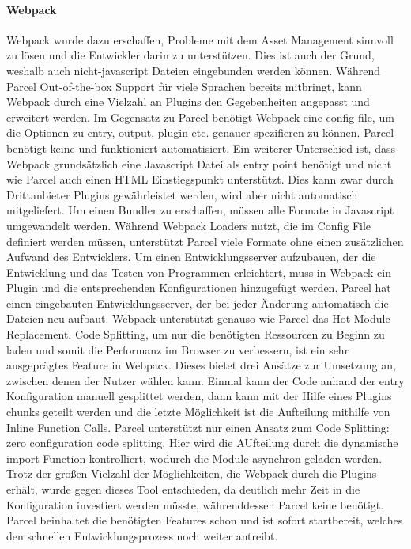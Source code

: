 \paragraph{Webpack} Webpack wurde dazu erschaffen, Probleme mit dem Asset Management sinnvoll zu lösen und die Entwickler darin zu unterstützen. Dies ist auch der Grund, weshalb auch nicht-javascript Dateien eingebunden werden können. Während Parcel Out-of-the-box Support für viele Sprachen bereits mitbringt, kann Webpack durch eine Vielzahl an Plugins den Gegebenheiten angepasst und erweitert werden. Im Gegensatz zu Parcel benötigt Webpack eine config file, um die Optionen zu entry, output, plugin etc. genauer spezifieren zu können. Parcel benötigt keine und funktioniert automatisiert. Ein weiterer Unterschied ist, dass Webpack grundsätzlich eine Javascript Datei als entry point benötigt und nicht wie Parcel auch einen HTML Einstiegspunkt unterstützt. Dies kann zwar durch Drittanbieter Plugins gewährleistet werden, wird aber nicht automatisch mitgeliefert. Um einen Bundler zu erschaffen, müssen alle Formate in Javascript umgewandelt werden. Während Webpack Loaders nutzt, die im Config File definiert werden müssen, unterstützt Parcel viele Formate ohne einen zusätzlichen Aufwand des Entwicklers. Um einen Entwicklungsserver aufzubauen, der die Entwicklung und das Testen von Programmen erleichtert, muss in Webpack ein Plugin und die entsprechenden Konfigurationen hinzugefügt werden. Parcel hat einen eingebauten Entwicklungsserver, der bei jeder Änderung automatisch die Dateien neu aufbaut. Webpack unterstützt genauso wie Parcel das Hot Module Replacement. Code Splitting, um nur die benötigten Ressourcen zu Beginn zu laden und somit die Performanz im Browser zu verbessern, ist ein sehr ausgeprägtes Feature in Webpack. Dieses bietet drei Ansätze zur Umsetzung an, zwischen denen der Nutzer wählen kann. Einmal kann der Code anhand der entry Konfiguration manuell gesplittet werden, dann kann mit der Hilfe eines Plugins chunks geteilt werden und die letzte Möglichkeit ist die Aufteilung mithilfe von Inline Function Calls. Parcel unterstützt nur einen Ansatz zum Code Splitting: zero configuration code splitting. Hier wird die AUfteilung durch die dynamische import Function kontrolliert, wodurch die Module asynchron geladen werden.
\\
Trotz der großen Vielzahl der Möglichkeiten, die Webpack durch die Plugins erhält, wurde gegen dieses Tool entschieden, da deutlich mehr Zeit in die Konfiguration investiert werden müsste, währenddessen Parcel keine benötigt. Parcel beinhaltet die benötigten Features schon und ist sofort startbereit, welches den schnellen Entwicklungsprozess noch weiter antreibt. 

